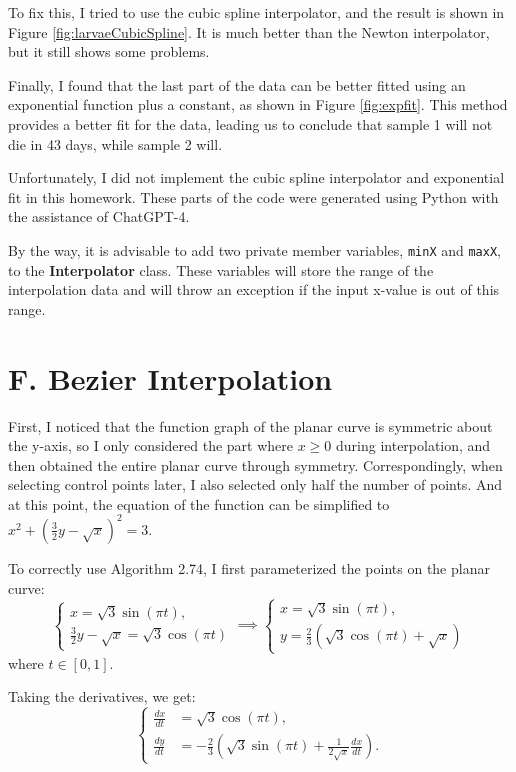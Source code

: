 \documentclass[a4paper]{article}
\begin{document}
To fix this, I tried to use the cubic spline interpolator, and the result is shown in Figure \ref{fig:larvaeCubicSpline}. It is much better than the Newton interpolator, but it still shows some problems.

Finally, I found that the last part of the data can be better fitted using an exponential function plus a constant, as shown in Figure \ref{fig:expfit}. This method provides a better fit for the data, leading us to conclude that sample 1 will not die in 43 days, while sample 2 will.

Unfortunately, I did not implement the cubic spline interpolator and exponential fit in this homework. These parts of the code were generated using Python with the assistance of ChatGPT-4.

By the way, it is advisable to add two private member variables, \texttt{minX} and \texttt{maxX}, to the \textbf{Interpolator} class. These variables will store the range of the interpolation data and will throw an exception if the input x-value is out of this range.

\section{F. Bezier Interpolation}
First, I noticed that the function graph of the planar curve is symmetric about the y-axis, so I only considered the part where \( x \geq 0 \) during interpolation, and then obtained the entire planar curve through symmetry. Correspondingly, when selecting control points later, I also selected only half the number of points. And at this point, the equation of the function can be simplified to \( x^2 + \left(\frac{3}{2}y - \sqrt{x}\right)^2 = 3 \).

To correctly use Algorithm 2.74, I first parameterized the points on the planar curve:
\[
\begin{cases}
  x = \sqrt{3} \sin(\pi t), \\
  \frac{3}{2}y - \sqrt{x} = \sqrt{3} \cos(\pi t)
\end{cases}
\implies
\begin{cases}
  x = \sqrt{3} \sin(\pi t), \\
  y = \frac{2}{3} \left( \sqrt{3} \cos(\pi t) + \sqrt{x} \right)
\end{cases}
\]
where \( t \in [0, 1] \).

Taking the derivatives, we get:
\[
\begin{cases}
  \frac{dx}{dt} &= \sqrt{3} \cos(\pi t), \\
  \frac{dy}{dt} &= -\frac{2}{3} \left( \sqrt{3} \sin(\pi t) + \frac{1}{2\sqrt{x}} \frac{dx}{dt} \right).
\end{cases}
\]
\end{document}
